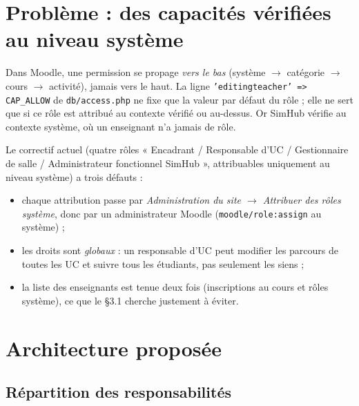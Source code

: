 \documentclass[11pt,a4paper]{article}
\newcommand{\code}[1]{\texttt{\small #1}}
\begin{document}
\section{Problème : des capacités vérifiées au niveau système}

Dans Moodle, une permission se propage \emph{vers le bas} (système $\rightarrow$
catégorie $\rightarrow$ cours $\rightarrow$ activité), jamais vers le haut. La ligne
\code{'editingteacher' => CAP\_ALLOW} de \code{db/access.php} ne fixe que la valeur par
défaut du rôle ; elle ne sert que si ce rôle est attribué au contexte vérifié ou au-dessus.
Or SimHub vérifie au contexte système, où un enseignant n'a jamais de rôle.

Le correctif actuel (quatre rôles « Encadrant / Responsable d'UC / Gestionnaire de salle /
Administrateur fonctionnel SimHub », attribuables uniquement au niveau système) a trois
défauts :
\begin{itemize}
  \item chaque attribution passe par \emph{Administration du site $\rightarrow$ Attribuer des
  rôles système}, donc par un administrateur Moodle (\code{moodle/role:assign} au système) ;
  \item les droits sont \emph{globaux} : un responsable d'UC peut modifier les parcours de
  toutes les UC et suivre tous les étudiants, pas seulement les siens ;
  \item la liste des enseignants est tenue deux fois (inscriptions au cours et rôles
  système), ce que le §3.1 cherche justement à éviter.
\end{itemize}

\section{Architecture proposée}

\subsection{Répartition des responsabilités}
\end{document}
